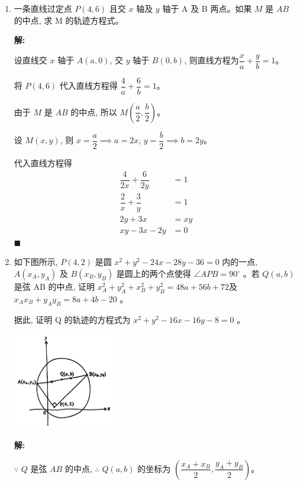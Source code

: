 \documentclass[10pt]{article}
\newcommand{\sol}{\textbf{解:} }
\begin{document}
\begin{enumerate}
  \item 一条直线过定点 $P(4,6)$ 且交 $x$ 轴及 $y$ 轴于 A 及 B 两点。如果 $M$ 是 $A B$ 的中点, 求 M 的轨迹方程式。

        \sol{}

        设直线交 $x$ 轴于 $A(a, 0)$, 交 $y$ 轴于 $B(0, b)$, 则直线方程为$\dfrac{x}{a}+\dfrac{y}{b}=1$。

        将 $P(4, 6)$ 代入直线方程得 $\dfrac{4}{a}+\dfrac{6}{b}=1$。

        由于 $M$ 是 $A B$ 的中点, 所以 $M\left(\dfrac{a}{2}, \dfrac{b}{2}\right)$。

        设 $M(x, y)$, 则 $x=\dfrac{a}{2} \implies a=2x$, $y=\dfrac{b}{2} \implies b=2y$。

        代入直线方程得
        \begin{align*}
          \dfrac{4}{2x}+\dfrac{6}{2y} & = 1  \\
          \dfrac{2}{x}+\dfrac{3}{y}   & = 1  \\
          2y+3x                       & = xy \\
          xy-3x-2y                    & = 0
        \end{align*} \hfill$\blacksquare$

        \newpage
  \item 如下图所示, $P(4,2)$ 是圆 $x^2+y^2-24 x-28 y-36=0$ 内的一点, $A\left(x_{A}, y_{A}\right)$ 及 $B\left(x_{B}, y_{B}\right)$ 是圆上的两个点使得 $\angle APB=90^{\circ}$ 。若 $Q(a, b)$ 是弦 AB 的中点, 证明 $x_{A}^2+y_{A}^2+x_{B}^2+y_{B}^2=48 a+56 b+72$及 $x_{A} x_{B}+y_{A} y_{B}=8 a+4 b-20$ 。

        据此, 证明 Q 的轨迹的方程式为 $x^2+y^2-16 x-16 y-8=0$ 。
        \begin{center}
          \includegraphics[width=0.35\textwidth]{./images/nice.png}
        \end{center}

        \sol{}

        $\because$ $Q$ 是弦 $AB$ 的中点, $\therefore$ $Q(a, b)$ 的坐标为 $\left(\dfrac{x_{A}+x_{B}}{2}, \dfrac{y_{A}+y_{B}}{2}\right)$。


\end{enumerate}
\end{document}

